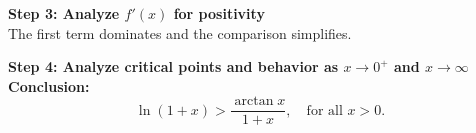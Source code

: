 \documentclass{article}
\begin{document}
	\textbf{Step 3: Analyze \(f'(x)\) for positivity} \\
	The first term dominates and the comparison simplifies.
	
	\textbf{Step 4: Analyze critical points and behavior as \(x \to 0^+\) and \(x \to \infty\)} \\
	
	\textbf{Conclusion:} \\
	\[
	\ln(1+x) > \frac{\arctan x}{1+x}, \quad \text{for all } x > 0.
	\]
	
			\subsubsection{}
\end{document}
